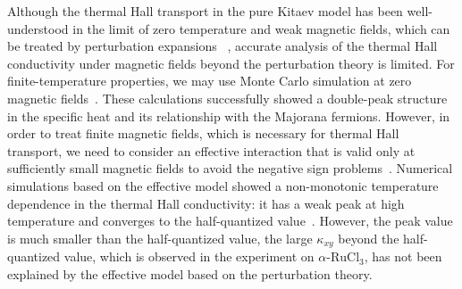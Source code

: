 \documentclass[twocolumn,superscriptaddress,showpacs, longbibliography, aps, prb]{revtex4-2}
\newcommand{\blue}[1]{\textcolor{blue}{#1}}
\begin{document}
Although the thermal Hall transport in the pure Kitaev model has been well-understood 
in the limit of zero temperature 
and weak magnetic fields, which %
can be treated by perturbation expansions
~\cite{Kitaev2006}, 
accurate analysis of the thermal Hall conductivity under
magnetic fields beyond the perturbation theory is limited. 
For finite-temperature properties, we may use Monte Carlo simulation %
at zero magnetic fields~\cite{NasuUM2014,NasuUM2015}. 
These calculations successfully showed a double-peak structure in the specific heat and its relationship %
with the Majorana fermions. 
However, in order to treat finite 
magnetic fields, which is necessary for thermal Hall transport, we need to consider an effective interaction %
that is valid only at sufficiently small magnetic fields to avoid the negative sign problems~\cite{NasuYM2017}. 
Numerical simulations based on the effective model showed a non-monotonic temperature dependence 
in the thermal Hall conductivity: it has a weak peak at high temperature and 
converges to the half-quantized value~\cite{NasuYM2017}. 
However, the peak value is much smaller than the half-quantized value, 
the %
large $\kappa_{xy}$ beyond the half-quantized value, 
which is observed in the experiment %
on $\alpha$-$\mathrm{RuCl_3}$, 
has not been explained by the effective model based on the perturbation theory.
\end{document}
